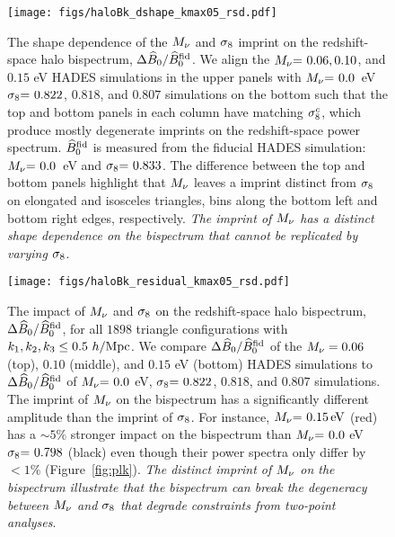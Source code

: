 \begin{figure}
\begin{center}
\texttt{[image: figs/haloBk\_dshape\_kmax05\_rsd.pdf]} 
    \caption{The shape dependence of the $M_\nu$ and $\sigma_8$ imprint on 
    the redshift-space halo bispectrum, $\Delta \widehat{B}_0/\widehat{B}_0^\mathrm{fid}$. 
    We align the $M_\nu{=}~0.06, 0.10$, and $0.15$ eV HADES simulations 
    in the upper panels with $M_\nu{=}~0.0$~eV $\sigma_8{=}~0.822$, $0.818$, and $0.807$ 
    simulations on the bottom such that the top and bottom panels in each column 
    have matching $\sigma_8^{c}$, which produce mostly degenerate imprints on the 
    redshift-space power spectrum. $\widehat{B}_0^{\rm fid}$ is measured from the 
    fiducial HADES simulation: $M_\nu{=}~0.0$~eV and $\sigma_8{=}~0.833$. 
    The difference between the top and bottom 
    panels highlight that $M_\nu$ leaves a imprint distinct from $\sigma_8$ on 
    elongated and isosceles triangles, bins along the bottom left and bottom 
    right edges, respectively. {\em The imprint of $M_\nu$ has a distinct shape 
    dependence on the bispectrum that cannot be replicated by varying $\sigma_8$}. 
    }
\label{fig:dbk_shape}
\end{center}
\end{figure}

\begin{figure}
\begin{center}
\texttt{[image: figs/haloBk\_residual\_kmax05\_rsd.pdf]}
    \caption{The impact of $M_\nu$ and $\sigma_8$ on the redshift-space halo bispectrum,
    $\Delta \widehat{B}_0/\widehat{B}_0^\mathrm{fid}$, for all $1898$ triangle configurations with 
    $k_1, k_2, k_3 \leq 0.5~h/{\rm Mpc}$. We compare $\Delta \widehat{B}_0/\widehat{B}_0^\mathrm{fid}$ 
    of the $M_\nu = 0.06$ (top), $0.10$ (middle), and $0.15$ eV (bottom) HADES simulations 
    to $\Delta \widehat{B}_0/\widehat{B}_0^\mathrm{fid}$ of $M_\nu{=}~0.0$ eV, $\sigma_8{=}~0.822$, $0.818$, and 
    $0.807$ simulations. The imprint of $M_\nu$ on the bispectrum has a significantly different 
    amplitude than the imprint of $\sigma_8$. For instance, $M_\nu{=}~0.15\,\mathrm{eV}$ (red) 
    has a $\sim 5\%$ stronger impact on the bispectrum than $M_\nu{=}~0.0$ eV  
    $\sigma_8{=}~0.798$ (black) even though their power spectra only differ by $< 1\%$ 
    (Figure~\ref{fig:plk}). {\em The distinct imprint of $M_\nu$ on the bispectrum 
    illustrate that the bispectrum can break the degeneracy between $M_\nu$ and $\sigma_8$ 
    that degrade constraints from two-point analyses}.
    }
\label{fig:dbk_amp}
\end{center}
\end{figure}
